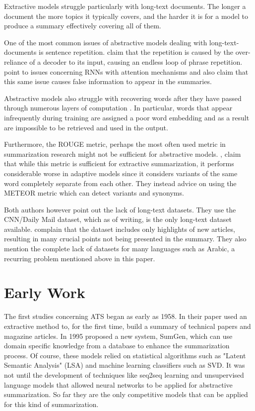 \documentclass{article}
\begin{document}
	Extractive models struggle particularly with long-text documents\cite{xiao}. The longer a document the more topics it typically covers, and the harder it is for a model to produce a summary effectively covering all of them.\par
	
	One of the most common issues of abstractive models dealing with long-text-documents is sentence repetition. \cite{abigail} claim that the repetition is caused by the over-reliance of a decoder to its input, causing an endless loop of phrase repetition. \cite{suleiman} point to issues concerning RNNs with attention mechanisms and also claim that this same issue causes false information to appear in the summaries. \par
	
	Abstractive models also struggle with recovering words after they have passed through numerous layers of computation \cite{abigail}. In particular, words that appear infrequently during training are assigned a poor word embedding and as a result are impossible to be retrieved and used in the output. \par 
	
	Furthermore, the ROUGE metric, perhaps the most often used metric in summarization research might not be sufficient for abstractive models. \cite{suleiman}, claim that while this metric is sufficient for extractive summarization, it performs considerable worse in adaptive models since it considers variants of the same word completely separate from each other. They instead advice on using the METEOR metric which can detect variants and synonyms. \par
	
	Both authors however point out the lack of long-text datasets. They use the CNN/Daily Mail dataset, which as of writing, is the only long-text dataset available. \cite{suleiman} complain that the dataset includes only highlights of new articles, resulting in many crucial points not being presented in the summary. They also mention the complete lack of datasets for many languages such as Arabic, a recurring problem mentioned above in this paper. \par
	
	
	\section{Early Work}
	
	The first studies concerning ATS began as early as 1958. In their paper \cite{luhn} used an extractive method to, for the first time, build a summary  of technical papers and magazine articles. In 1995 \cite{maybury} proposed a new system, SumGen, which can use domain specific knowledge from a database to enhance the summarization process. Of course, these models relied on statistical algorithms such as "Latent Semantic Analysis" (LSA) and machine learning classifiers such as SVD. It was not until the development of techniques like seq2seq learning and unsupervised language models that allowed neural networks to be applied for abstractive summarization. So far they are the only competitive models that can be applied for this kind of summarization.
	
\end{document}
